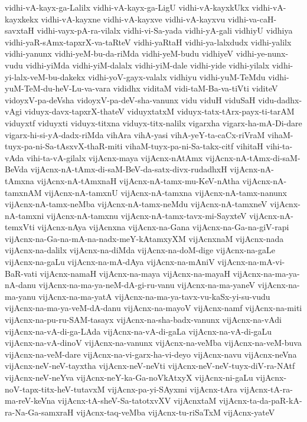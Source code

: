 {vidhi-vA-kayx-ga-Lalilx
vidhi-vA-kayx-ga-LigU
vidhi-vA-kayxkUkx
vidhi-vA-kayxkekx
vidhi-vA-kayxne
vidhi-vA-kayxve
vidhi-vA-kayxvu
vidhi-va-caH-savxtaH
vidhi-vayx-pA-ra-vilalx
vidhi-vi-Sa-yada
vidhi-yA-gali
vidhiyU
vidhiya
vidhi-yaR-sAmx-tapxrX-va-taRteV
vidhi-yaRtaH
vidhi-ya-lalxdudx
vidhi-yalilx
vidhi-yanunx
vidhi-yeM-bu-da-riMda
vidhi-yeM-budu
vidhiyeV
vidhi-ye-nunx-vudu
vidhi-yiMda
vidhi-yiM-dalalx
vidhi-yiM-dale
vidhi-yide
vidhi-yilalx
vidhi-yi-lalx-veM-bu-dakekx
vidhi-yoV-gayx-valalx
vidhiyu
vidhi-yuM-TeMdu
vidhi-yuM-TeM-du-heV-Lu-va-vara
vididhx
viditaM
vidi-taM-Ba-va-tiVti
viditeV
vidoyxV-pa-deVsha
vidoyxV-pa-deV-sha-vanunx
vidu
viduH
viduSaH
vidu-dadhx-vAgi
viduyx-davx-tapxrX-thateV
viduyxtatxM
viduyx-tatx-tArx-payx-ti-tarAM
viduyxtf
viduyxti
viduyx-titxna
viduyx-titx-nalilx
vigarxha
vigarx-ha-mA-Di-dare
vigarx-hi-si-yA-dadx-riMda
vihAra
vihA-yasi
vihA-yeY-ta-caCx-riVraM
vihaM-tuyx-pa-ni-Sa-tAsxvX-thaR-miti
vihaM-tuyx-pa-ni-Sa-takx-citf
vihitaH
vihi-ta-vAda
vihi-ta-vA-gilalx
vijAcnx-maya
vijAcnx-nAtAmx
vijAcnx-nA-tAmx-di-saM-BeVda
vijAcnx-nA-tAmx-di-saM-BeV-da-satx-divx-rudadhxH
vijAcnx-nA-tAmxna
vijAcnx-nA-tAmxnaH
vijAcnx-nA-tamx-mu-KeV-nAtha
vijAcnx-nA-tamxnAM
vijAcnx-nA-tamxnU
vijAcnx-nA-tamxna
vijAcnx-nA-tamx-nanunx
vijAcnx-nA-tamx-neMba
vijAcnx-nA-tamx-neMdu
vijAcnx-nA-tamxneV
vijAcnx-nA-tamxni
vijAcnx-nA-tamxnu
vijAcnx-nA-tamx-tavx-mi-SayxteV
vijAcnx-nA-temxVti
vijAcnx-nAya
vijAcnxna
vijAcnx-na-Gana
vijAcnx-na-Ga-na-giV-rapi
vijAcnx-na-Ga-na-mA-na-nadx-meY-kAtamxyXM
vijAcnxnaM
vijAcnx-nada
vijAcnx-na-dalilx
vijAcnx-na-diMda
vijAcnx-na-doM-dige
vijAcnx-na-gaLe
vijAcnx-na-gaLu
vijAcnx-na-mA-dAya
vijAcnx-na-mAniV
vijAcnx-na-mA-vi-BaR-vati
vijAcnx-namaH
vijAcnx-na-maya
vijAcnx-na-mayaH
vijAcnx-na-ma-ya-nA-danu
vijAcnx-na-ma-ya-neM-dA-gi-ru-vanu
vijAcnx-na-ma-yaneV
vijAcnx-na-ma-yanu
vijAcnx-na-ma-yatA
vijAcnx-na-ma-ya-tavx-vu-kaSx-yi-su-vudu
vijAcnx-na-ma-ya-veM-dA-danu
vijAcnx-na-mayoV
vijAcnx-namf
vijAcnx-na-miti
vijAcnx-na-pu-ru-SAM-tasayx
vijAcnx-na-sha-badx-vanunx
vijAcnx-na-vAdi
vijAcnx-na-vA-di-ga-LAda
vijAcnx-na-vA-di-gaLa
vijAcnx-na-vA-di-gaLu
vijAcnx-na-vA-dinoV
vijAcnx-na-vanunx
vijAcnx-na-veMba
vijAcnx-na-veM-buva
vijAcnx-na-veM-dare
vijAcnx-na-vi-garx-ha-vi-deyo
vijAcnx-navu
vijAcnx-neVna
vijAcnx-neV-neV-tayxtha
vijAcnx-neV-neVti
vijAcnx-neV-neV-tuyx-diV-ra-NAtf
vijAcnx-neV-neYva
vijAcnx-neY-ka-Ga-noVkAtxyX
vijAcnx-ni-gaLu
vijAcnx-noV-tapx-titx-heV-tutavxM
vijAcnx-pa-yi-SAyxmi
vijAcnx-tAra
vijAcnx-tA-ra-ma-reV-keVna
vijAcnx-tA-sheV-Sa-tatotxvXV
vijAcnxtaM
vijAcnx-ta-da-paR-kA-ra-Na-Ga-samxraH
vijAcnx-taq-veMba
vijAcnx-tu-riSaTxM
vijAcnx-yateV
}
